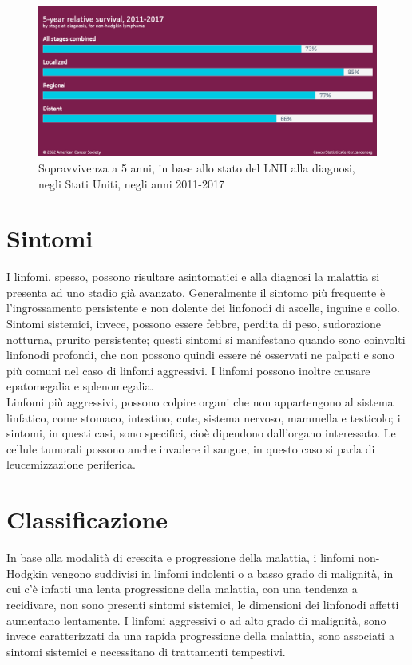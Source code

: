 \begin{figure}[H]
    \begin{center}
    \includegraphics[width=0.6\columnwidth]{img/5-yearrelativesurvival2011-2017.png}
    \vspace{-3mm}
    \end{center}
    \caption{Sopravvivenza a 5 anni, in base allo stato del LNH alla diagnosi, negli Stati Uniti, negli anni 2011-2017
    \cite{Americanstatistic}}

\end{figure}

\section{Sintomi}
I linfomi, spesso, possono risultare asintomatici e alla diagnosi la malattia si presenta ad uno stadio già avanzato.
Generalmente il sintomo più frequente è l’ingrossamento persistente e non dolente dei linfonodi di ascelle, inguine e 
collo\cite{LNHAIL}.\\ 
Sintomi sistemici, invece, possono essere febbre, perdita di peso, sudorazione notturna, prurito persistente; 
questi sintomi si manifestano quando sono coinvolti linfonodi profondi, che non possono quindi essere né osservati 
ne palpati e sono più comuni nel caso di linfomi aggressivi. I linfomi possono inoltre causare epatomegalia e 
splenomegalia\cite{AMERICANCANCER}.\\ 
Linfomi più aggressivi, possono colpire organi che non appartengono al sistema linfatico, come stomaco, intestino, 
cute, sistema nervoso, mammella e testicolo; i sintomi, in questi casi, sono specifici, cioè dipendono 
dall’organo interessato\cite{AMERICANCANCER}.
Le cellule tumorali possono anche invadere il sangue, in questo caso si parla di leucemizzazione periferica\cite{LNHAIL}.

\section{Classificazione}
In base alla modalità di crescita e progressione della malattia, i linfomi non-Hodgkin vengono suddivisi in 
linfomi indolenti o a basso grado di malignità, in cui c’è infatti una lenta progressione della malattia,
con una tendenza a recidivare, non sono presenti sintomi sistemici, le dimensioni dei linfonodi affetti aumentano lentamente. 
I linfomi aggressivi o ad alto grado di malignità, sono invece caratterizzati da una rapida progressione della malattia, 
sono associati a sintomi sistemici e necessitano di trattamenti tempestivi\cite{reteveneta}.\\


